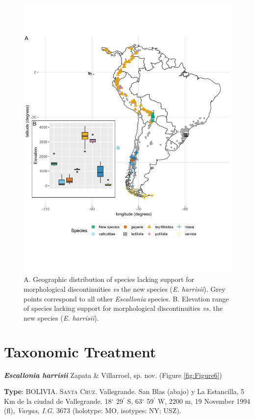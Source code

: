 \documentclass[fleqn,10pt,lineno]{wlpeerj} %
\begin{document}
\begin{figure}[ht]
\centering
\includegraphics[width=\linewidth]{Figure5}
\caption{A. Geographic distribution of species lacking support for morphological discontinuities \emph{vs} the new species (\emph{E. harrisii}). Grey points correspond to all other \emph{Escallonia} species. B. Elevation range of species lacking support for morphological discontinuities \emph{vs.} the new species (\emph{E. harrisii}).}
\label{fig:Figure5}
\end{figure}

\section*{Taxonomic Treatment}
\textbf{\emph{Escallonia harrisii}} Zapata \& Villarroel, sp. nov. (Figure \ref{fig:Figure6})

\textbf{Type}: BOLIVIA. \textsc{Santa Cruz}. Vallegrande. San Blas (abajo) y La Estancilla, 5 Km de la ciudad de Vallegrande. 18$^\circ$ 29$^\prime$ S, 63$^\circ$ 59$^\prime$ W, 2200 m, 19 November 1994 (fl), \textit{Vargas, I.G.} 3673 (holotype: MO, isotypes: NY; USZ).
\end{document}
